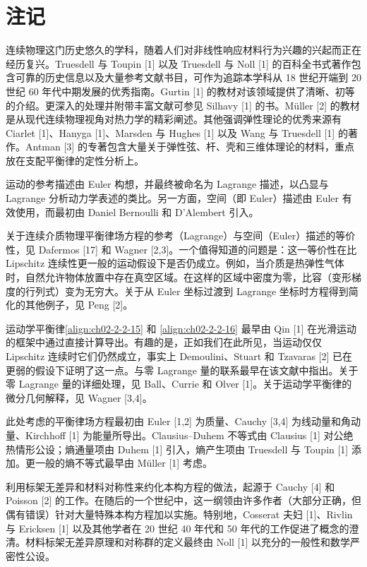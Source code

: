 \documentclass[../../main.tex]{subfiles}
\begin{document}
\section{注记}\label{section:ch02-注记}

连续物理这门历史悠久的学科，随着人们对非线性响应材料行为兴趣的兴起而正在经历复兴。Truesdell 与 Toupin [1] 以及 Truesdell 与 Noll [1] 的百科全书式著作包含可靠的历史信息以及大量参考文献书目，可作为追踪本学科从 18 世纪开端到 20 世纪 60 年代中期发展的优秀指南。Gurtin [1] 的教材对该领域提供了清晰、初等的介绍。更深入的处理并附带丰富文献可参见 Silhavy [1] 的书。Müller [2] 的教材是从现代连续物理视角对热力学的精彩阐述。其他强调弹性理论的优秀来源有 Ciarlet [1]、Hanyga [1]、Marsden 与 Hughes [1] 以及 Wang 与 Truesdell [1] 的著作。Antman [3] 的专著包含大量关于弹性弦、杆、壳和三维体理论的材料，重点放在支配平衡律的定性分析上。

运动的参考描述由 Euler 构想，并最终被命名为 Lagrange 描述，以凸显与 Lagrange 分析动力学表述的类比。另一方面，空间（即 Euler）描述由 Euler 有效使用，而最初由 Daniel Bernoulli 和 D'Alembert 引入。

关于连续介质物理平衡律场方程的参考（Lagrange）与空间（Euler）描述的等价性，见 Dafermos [17] 和 Wagner [2,3]。一个值得知道的问题是：这一等价性在比 Lipschitz 连续性更一般的运动假设下是否仍成立。例如，当介质是热弹性气体时，自然允许物体放置中存在真空区域。在这样的区域中密度为零，比容（变形梯度的行列式）变为无穷大。关于从 Euler 坐标过渡到 Lagrange 坐标时方程得到简化的其他例子，见 Peng [2]。

运动学平衡律\eqref{align:ch02-2-2-15} 和 \eqref{align:ch02-2-2-16} 最早由 Qin [1] 在光滑运动的框架中通过直接计算导出。有趣的是，正如我们在此所见，当运动仅仅 Lipschitz 连续时它们仍然成立，事实上 Demoulini、Stuart 和 Tzavaras [2] 已在更弱的假设下证明了这一点。与零 Lagrange 量的联系最早在该文献中指出。关于零 Lagrange 量的详细处理，见 Ball、Currie 和 Olver [1]。关于运动学平衡律的微分几何解释，见 Wagner [3,4]。

此处考虑的平衡律场方程最初由 Euler [1,2] 为质量、Cauchy [3,4] 为线动量和角动量、Kirchhoff [1] 为能量所导出。Clausius--Duhem 不等式由 Clausius [1] 对公绝热情形公设；熵通量项由 Duhem [1] 引入，熵产生项由 Truesdell 与 Toupin [1] 添加。更一般的熵不等式最早由 Müller [1] 考虑。

利用标架无差异和材料对称性来约化本构方程的做法，起源于 Cauchy [4] 和 Poisson [2] 的工作。在随后的一个世纪中，这一纲领由许多作者（大部分正确，但偶有错误）针对大量特殊本构方程加以实施。特别地，Cosserat 夫妇 [1]、Rivlin 与 Ericksen [1] 以及其他学者在 20 世纪 40 年代和 50 年代的工作促进了概念的澄清。材料标架无差异原理和对称群的定义最终由 Noll [1] 以充分的一般性和数学严密性公设。
\end{document}
